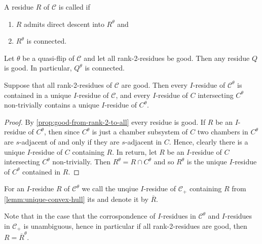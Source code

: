 \begin{defi}
	A residue $R$ of $\mathcal{C}$ is called  if
	\begin{enumerate}
		\item $R$ admits direct descent into $R^\theta$ and
		\item $R^\theta$ is connected.
	\end{enumerate}
\end{defi}

\begin{prop}
	Let $\theta$ be a quasi-flip of $\mathcal{C}$ and let all rank-2-residues be good. Then any residue $Q$ is good. In particular, $Q^\theta$ is connected.
\end{prop}

\begin{lemm}
	Suppose that all rank-2-residues of $\mathcal C$ are good. Then every $I$-residue of $\mathcal C^\theta$ is contained in a unique $I$-residue of $\mathcal C$, and every $I$-residue of $C$ intersecting $C^\theta$ non-trivially contains a unique $I$-residue of $C^\theta$.

	\begin{proof}
		By \ref{prop:good-from-rank-2-to-all} every residue is good. If $R$ be an $I$-residue of $C^\theta$, then since $C^\theta$ is just a chamber subsystem of $C$ two chambers in $C^\theta$ are $s$-adjacent of and only if they are $s$-adjacent in $C$. Hence, clearly there is a unique $I$-residue of $C$ containing $R$. In return, let $R$ be an $I$-residue of $C$ intersecting $C^\theta$ non-trivially. Then $R^\theta = R \cap C^\theta$ and so $R^\theta$ is the unique $I$-residue of $C^\theta$ contained in $R$.
	\end{proof}
\end{lemm}

\begin{defi}
	For an $I$-residue $R$ of $\mathcal C^\theta$ we call the unqiue $I$-residue of $\mathcal C_+$ containing $R$ from \ref{lemm:unique-convex-hull} its  and denote it by $\overline R$.
\end{defi}

\begin{rema}
	Note that in the case that the corrospondence of $I$-residues in $\mathcal C^\theta$ and $I$-residues in $\mathcal C_+$ is unambiguous, hence in particular if all rank-2-residues are good, then $R = \overline R^\theta$.
\end{rema}

